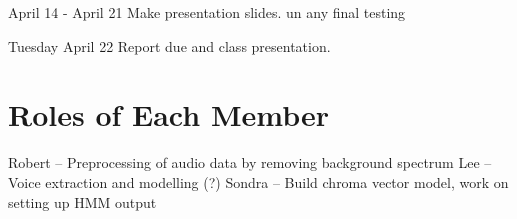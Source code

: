 \documentclass{article}
\begin{document}
April 14 - April 21\newline
Make presentation slides. un any final testing\newline
\newline

Tuesday April 22\newline
Report due and class presentation.\newline
\newline

\section{Roles of Each Member}

Robert -- Preprocessing of audio data by removing background spectrum \newline
Lee -- Voice extraction and modelling (?) \newline
Sondra -- Build chroma vector model, work on setting up HMM output\newline
\end{document}
